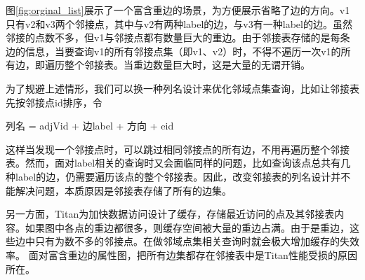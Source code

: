 图\ref{fig:orginal_list}展示了一个富含重边的场景，为方便展示省略了边的方向。v1只有v2和v3两个邻接点，其中与v2有两种label的边，与v3有一种label的边。虽然邻接的点数不多，但v1与邻接点都有数量巨大的重边。由于邻接表存储的是每条边的信息，当要查询v1的所有邻接点集（即v1、v2）时，不得不遍历一次v1的所有边，即遍历整个邻接表。当重边数量巨大时，这是大量的无谓开销。

为了规避上述情形，我们可以换一种列名设计来优化邻域点集查询，比如让邻接表先按邻接点id排序，令
\begin{center}
  列名 = adjVid + 边label + 方向 + eid
\end{center}
这样当发现一个邻接点时，可以跳过相同邻接点的所有边，不用再遍历整个邻接表。然而，面对label相关的查询时又会面临同样的问题，比如查询该点总共有几种label的边，仍需要遍历该点的整个邻接表。因此，改变邻接表的列名设计并不能解决问题，本质原因是邻接表存储了所有的边集。

另一方面，Titan为加快数据访问设计了缓存，存储最近访问的点及其邻接表内容。如果图中各点的重边都很多，则缓存空间被大量的重边占满。由于是重边，这些边中只有为数不多的邻接点。在做邻域点集相关查询时就会极大增加缓存的失效率。
面对富含重边的属性图，把所有边集都存在邻接表中是Titan性能受损的原因所在。

